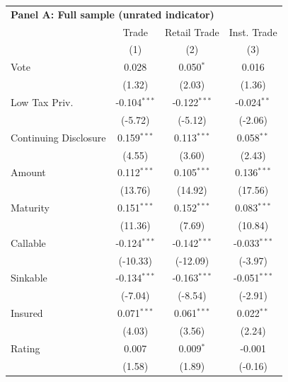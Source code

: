 \begingroup
\centering
\begin{tabular*}{\textwidth}{@{\extracolsep{\fill}}lccc}
\multicolumn{5}{l}{\textbf{Panel A: Full sample (unrated indicator)}}\\

\addlinespace
   \toprule
                         & Trade          & Retail Trade   & Inst. Trade\\  
                         & (1)            & (2)            & (3)\\  
   \midrule 
   Vote                  & 0.028          & 0.050$^{*}$    & 0.016\\   
                         & (1.32)        & (2.03)        & (1.36)\\   
   Low Tax Priv.         & -0.104$^{***}$ & -0.122$^{***}$ & -0.024$^{**}$\\   
                         & (-5.72)       & (-5.12)       & (-2.06)\\   
   Continuing Disclosure & 0.159$^{***}$  & 0.113$^{***}$  & 0.058$^{**}$\\   
                         & (4.55)        & (3.60)        & (2.43)\\   
   Amount                & 0.112$^{***}$  & 0.105$^{***}$  & 0.136$^{***}$\\   
                         & (13.76)       & (14.92)       & (17.56)\\   
   Maturity              & 0.151$^{***}$  & 0.152$^{***}$  & 0.083$^{***}$\\   
                         & (11.36)       & (7.69)        & (10.84)\\   
   Callable              & -0.124$^{***}$ & -0.142$^{***}$ & -0.033$^{***}$\\   
                         & (-10.33)      & (-12.09)      & (-3.97)\\   
   Sinkable              & -0.134$^{***}$ & -0.163$^{***}$ & -0.051$^{***}$\\   
                         & (-7.04)       & (-8.54)       & (-2.91)\\   
   Insured               & 0.071$^{***}$  & 0.061$^{***}$  & 0.022$^{**}$\\   
                         & (4.03)        & (3.56)        & (2.24)\\   
   Rating                & 0.007          & 0.009$^{*}$    & -0.001\\   
                         & (1.58)        & (1.89)        & (-0.16)\\   

\end{tabular*}
